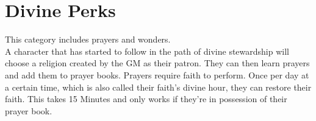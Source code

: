 \chapter{Divine Perks}\label{divinePerks}
This category includes prayers and wonders.\\
A character that has started to follow in the path of divine stewardship will choose a religion created by the GM as their patron.
They can then learn prayers and add them to prayer books.
Prayers require faith to perform.
Once per day at a certain time, which is also called their faith's divine hour, they can restore their faith.
This takes 15 Minutes and only works if they're in possession of their prayer book.

	
	
	
	
	
	
	

	

	
	
	
	
	
	
	